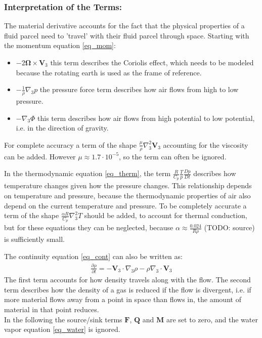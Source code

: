 \subsubsection{Interpretation of the Terms:}
The material derivative accounts for the fact that the physical properties of a fluid parcel need to 'travel' with their fluid parcel through space.
Starting with the momentum equation \ref{eq_mom}:
\begin{itemize}
\item $-2\boldsymbol{\Omega}\times \textbf{V}_3$ this term describes the Coriolis effect, which needs to be modeled because the rotating earth is used as the frame of reference.
\item $- \frac{1}{\rho}\nabla _3 p$ the pressure force term describes how air flows from high to low pressure.
\item $- \nabla _3 \Phi$ this term describes how air flows from high potential to low potential, i.e. in the direction of gravity.
\end{itemize}
For complete accuracy a term of the shape $\frac{\mu}{\rho} \nabla _3^2 \textbf{V}_3$ accounting for the viscosity can be added.
However $\mu \approx 1.7\cdot 10^{-5}$, so the term can often be ignored.

In the thermodynamic equation \ref{eq_therm}, the term $\frac{R}{C_p}\frac{T}{p}\frac{Dp}{Dt}$ describes how temperature changes given how the pressure changes.
This relationship depends on temperature and pressure, because the thermodynamic properties of air also depend on the current temperature and pressure.
To be completely accurate a term of the shape $\frac{\alpha R}{C_p}\nabla _3^2 T$ should be added, to account for thermal conduction, but for these equations they can be neglected, because $\alpha \approx \frac{0.024}{R\rho}$ (TODO: source) is sufficiently small.

The continuity equation \ref{eq_cont} can also be written as:
\begin{align*}
\frac{\partial \rho}{\partial t} =  - \textbf{V}_3 \cdot \nabla _3 \rho -\rho \nabla _3 \cdot \textbf{V}_3 
\end{align*}
The first term accounts for how density travels along with the flow.
The second term describes how the density of a gas is reduced if the flow is divergent, i.e. if more material flows away from a point in space than flows in, the amount of material in that point reduces.\\
In the following the source/sink terms $\textbf{F}$, $\textbf{Q}$ and $\textbf{M}$ are set to zero, and the water vapor equation \ref{eq_water} is ignored.


